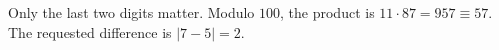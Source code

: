 Only the last two digits matter. Modulo $100$, the product is $11\cdot 87=957\equiv 57$. The requested difference is $|7-5|=\boxed 2$.
